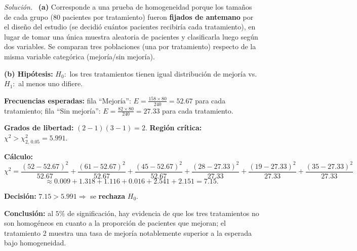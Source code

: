 \documentclass[11pt,a4paper]{article}
\newenvironment{solucion}{\par\noindent\textit{Solución.}~}{\par\vspace{1em}}
\begin{document}
\begin{solucion}
\textbf{(a)} Corresponde a una prueba de homogeneidad porque los tamaños de cada grupo ($80$ pacientes por tratamiento) fueron \textbf{fijados de antemano} por el diseño del estudio (se decidió cuántos pacientes recibiría cada tratamiento), en lugar de tomar una única muestra aleatoria de pacientes y clasificarla luego según dos variables. Se comparan tres poblaciones (una por tratamiento) respecto de la misma variable categórica (mejoría/sin mejoría).

\textbf{(b) Hipótesis:} $H_0:$ los tres tratamientos tienen igual distribución de mejoría vs. $H_1:$ al menos uno difiere.

\textbf{Frecuencias esperadas:} fila ``Mejoría'': $E=\frac{158\times80}{240}=52.67$ para cada tratamiento; fila ``Sin mejoría'': $E=\frac{82\times80}{240}=27.33$ para cada tratamiento.

\textbf{Grados de libertad:} $(2-1)(3-1)=2$. \textbf{Región crítica:} $\chi^2>\chi^2_{2,\,0.05}=5.991$.

\textbf{Cálculo:}
\[
\chi^2=\frac{(52-52.67)^2}{52.67}+\frac{(61-52.67)^2}{52.67}+\frac{(45-52.67)^2}{52.67}+\frac{(28-27.33)^2}{27.33}+\frac{(19-27.33)^2}{27.33}+\frac{(35-27.33)^2}{27.33}
\]
\[
\approx0.009+1.318+1.116+0.016+2.541+2.151=7.15.
\]

\textbf{Decisión:} $7.15>5.991\Rightarrow$ se \textbf{rechaza} $H_0$.

\textbf{Conclusión:} al $5\%$ de significación, hay evidencia de que los tres tratamientos no son homogéneos en cuanto a la proporción de pacientes que mejoran; el tratamiento 2 muestra una tasa de mejoría notablemente superior a la esperada bajo homogeneidad.
\end{solucion}
\end{document}
